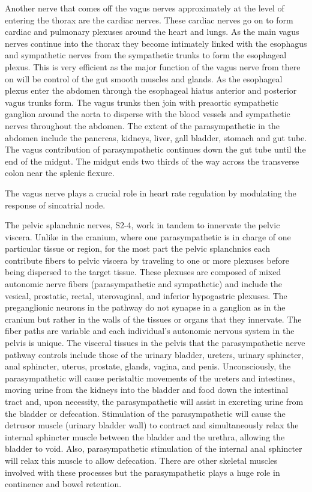 \documentclass[]{book}
\begin{document}
Another nerve that comes off the vagus nerves approximately at the level of entering the thorax are the cardiac nerves. These cardiac nerves go on to form cardiac and pulmonary plexuses around the heart and lungs. As the main vagus nerves continue into the thorax they become intimately linked with the esophagus and sympathetic nerves from the sympathetic trunks to form the esophageal plexus. This is very efficient as the major function of the vagus nerve from there on will be control of the gut smooth muscles and glands. As the esophageal plexus enter the abdomen through the esophageal hiatus anterior and posterior vagus trunks form. The vagus trunks then join with preaortic sympathetic ganglion around the aorta to disperse with the blood vessels and sympathetic nerves throughout the abdomen. The extent of the parasympathetic in the abdomen include the pancreas, kidneys, liver, gall bladder, stomach and gut tube. The vagus contribution of parasympathetic continues down the gut tube until the end of the midgut. The midgut ends two thirds of the way across the transverse colon near the splenic flexure.

The vagus nerve plays a crucial role in heart rate regulation by modulating the response of sinoatrial node.

The pelvic splanchnic nerves, S2-4, work in tandem to innervate the pelvic viscera. Unlike in the cranium, where one parasympathetic is in charge of one particular tissue or region, for the most part the pelvic splanchnics each contribute fibers to pelvic viscera by traveling to one or more plexuses before being dispersed to the target tissue. These plexuses are composed of mixed autonomic nerve fibers (parasympathetic and sympathetic) and include the vesical, prostatic, rectal, uterovaginal, and inferior hypogastric plexuses. The preganglionic neurons in the pathway do not synapse in a ganglion as in the cranium but rather in the walls of the tissues or organs that they innervate. The fiber paths are variable and each individual's autonomic nervous system in the pelvis is unique. The visceral tissues in the pelvis that the parasympathetic nerve pathway controls include those of the urinary bladder, ureters, urinary sphincter, anal sphincter, uterus, prostate, glands, vagina, and penis. Unconsciously, the parasympathetic will cause peristaltic movements of the ureters and intestines, moving urine from the kidneys into the bladder and food down the intestinal tract and, upon necessity, the parasympathetic will assist in excreting urine from the bladder or defecation. Stimulation of the parasympathetic will cause the detrusor muscle (urinary bladder wall) to contract and simultaneously relax the internal sphincter muscle between the bladder and the urethra, allowing the bladder to void. Also, parasympathetic stimulation of the internal anal sphincter will relax this muscle to allow defecation. There are other skeletal muscles involved with these processes but the parasympathetic plays a huge role in continence and bowel retention.
\end{document}
